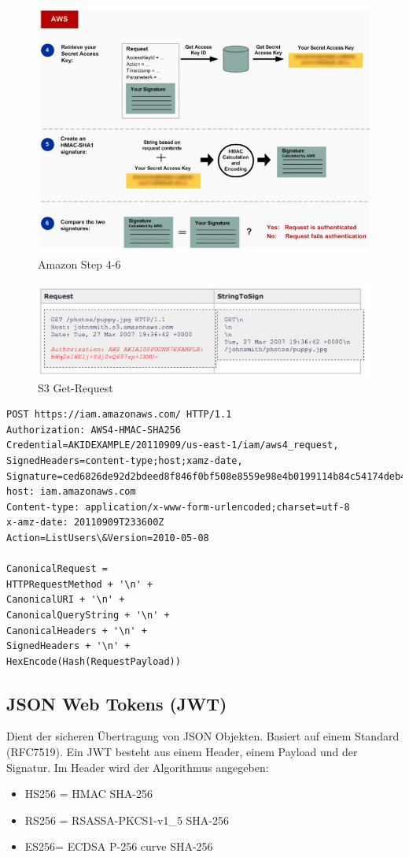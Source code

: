 \begin{figure}[h!]
\centering
\includegraphics[width=0.6\linewidth]{fig/amazon-steps-4-6}
\caption{Amazon Step 4-6}
\label{fig:amazon-steps-4-6}
\end{figure}

\begin{figure}[h!]
\centering
\includegraphics[width=1\linewidth]{fig/s3getrequest}
\caption{S3 Get-Request}
\label{fig:s3getrequest}
\end{figure}

\newpage
\begin{lstlisting}[caption=S4 POST-Request mit Security Felder]
POST https://iam.amazonaws.com/ HTTP/1.1
Authorization: AWS4-HMAC-SHA256
Credential=AKIDEXAMPLE/20110909/us-east-1/iam/aws4_request, SignedHeaders=content-type;host;xamz-date,
Signature=ced6826de92d2bdeed8f846f0bf508e8559e98e4b0199114b84c54174deb456c
host: iam.amazonaws.com
Content-type: application/x-www-form-urlencoded;charset=utf-8
x-amz-date: 20110909T233600Z
Action=ListUsers\&Version=2010-05-08

CanonicalRequest =
HTTPRequestMethod + '\n' +
CanonicalURI + '\n' +
CanonicalQueryString + '\n' +
CanonicalHeaders + '\n' +
SignedHeaders + '\n' +
HexEncode(Hash(RequestPayload))
\end{lstlisting}

\subsection{JSON Web Tokens (JWT)}

Dient der sicheren Übertragung von JSON Objekten. Basiert auf einem Standard (RFC7519). Ein JWT besteht aus einem Header,  einem Payload und der Signatur. Im Header wird der Algorithmus angegeben:
\begin{itemize}
	\item HS256 = HMAC SHA-256
	\item RS256 = RSASSA-PKCS1-v1\_5 SHA-256
	\item ES256= ECDSA P-256 curve SHA-256
\end{itemize}

